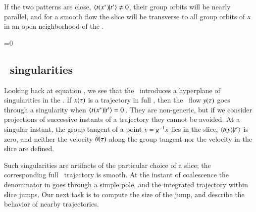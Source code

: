 

If the two patterns are close, $\braket{\groupTan(\sspSing)}{\sliceTan{}}
\neq 0$, their group orbits will be nearly parallel, and for a smooth
flow the slice will be transverse to all group orbits of $x$ in an
open neighborhood of the {\template} \slicep.


\beq
\braket{\groupTan(\sspSing)}{\sliceTan{}}=0

\subsection{\Slice\ singularities}
\label{sec:sliceSing}

Looking back at equation ,
we see that the \mslices\ introduces a hyperplane of singularities
in the \reducedsp.
If $x(\tau)$ is a trajectory in full {\statesp}, then the
\reducedsp\ flow $y(\tau)$ goes through a singularity when
$\braket{\groupTan_{}(\sspSing)}{\sliceTan{}}=0$\,.
They are non-generic, but
if we consider projections of successive instants of a trajectory
they cannot be avoided.
At a singular instant, the group tangent of a point
$y=g^{-1} x$ lies in the slice,
$\braket{\groupTan(\sspRed)}{\sliceTan{}}$ is zero,
and neither the velocity $\dot{{\bf \theta}}(\tau)$ along the group tangent
nor the velocity in the slice are defined.

Such singularities are artifacts of the particular choice of a slice; the
corresponding full \statesp\ trajectory is smooth. At the instant of
coalescence the denominator in  goes through a simple
pole, and the integrated trajectory within slice jumps. Our next task is
to compute the size of the jump, and describe the behavior of nearby
trajectories.


